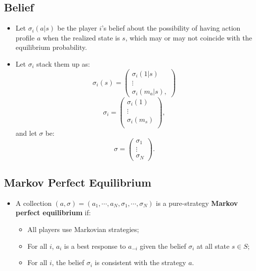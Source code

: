 \documentclass[]{book}
\providecommand{\tightlist}{%
  \setlength{\itemsep}{0pt}\setlength{\parskip}{0pt}}
\begin{document}
\subsection{Belief}\label{belief-1}

\begin{itemize}
\tightlist
\item
  Let \(\sigma_i(a|s)\) be the player \(i\)'s belief about the
  possibility of having action profile \(a\) when the realized state is
  \(s\), which may or may not coincide with the equilibrium probability.
\item
  Let \(\sigma_i\) stack them up as: \[
  \sigma_i(s) =
  \begin{pmatrix}
  \sigma_i(1|s)\\
  \vdots\\
  \sigma_i(m_a|s),
  \end{pmatrix}
  \] \[
  \sigma_i =
  \begin{pmatrix}
  \sigma_i(1)\\
  \vdots \\
  \sigma_i(m_s)\\
  \end{pmatrix},
  \] and let \(\sigma\) be: \[
  \sigma = 
  \begin{pmatrix}
  \sigma_1 \\
  \vdots\\
  \sigma_N
  \end{pmatrix}.
  \]
\end{itemize}

\subsection{Markov Perfect
Equilibrium}\label{markov-perfect-equilibrium}

\begin{itemize}
\tightlist
\item
  A collection
  \((a, \sigma) = (a_1, \cdots, a_N, \sigma_1, \cdots, \sigma_N)\) is a
  pure-strategy \textbf{Markov perfect equilibrium} if:

  \begin{itemize}
  \tightlist
  \item
    All players use Markovian strategies;
  \item
    For all \(i\), \(a_i\) is a best response to \(a_{-i}\) given the
    belief \(\sigma_i\) at all state \(s \in S\);
  \item
    For all \(i\), the belief \(\sigma_i\) is consistent with the
    strategy \(a\).
  \end{itemize}
\end{itemize}
\end{document}
